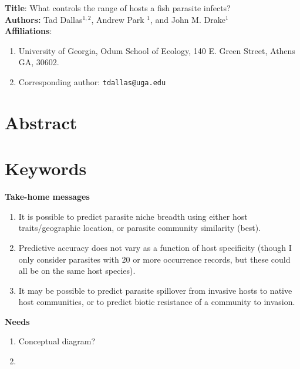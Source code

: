 \documentclass[12pt]{article}
\begin{document}
\setcounter{page}{1}

\textbf{Title}: What controls the range of hosts a fish parasite infects? \\
\vspace{0.5cm}
\textbf{Authors:} Tad Dallas$^{1,2}$, Andrew Park $^{1}$, and John M. Drake$^{1}$ \\
\vspace{0.5cm}
\textbf{Affiliations}: 
\begin{enumerate}
  \item University of Georgia, Odum School of Ecology, 140 E. Green Street, Athens GA, 30602. 
  \item Corresponding author: \texttt{tdallas@uga.edu}
\end{enumerate}


\linenumbers
\doublespacing


\section{Abstract}



\section{Keywords}





\textbf{Take-home messages} \\
\begin{enumerate}
 \item It is possible to predict parasite niche breadth using either host traits/geographic location, or parasite community similarity (best). 
 \item Predictive accuracy does not vary as a function of host specificity (though I only consider parasites with 20 or more occurrence records, but these could all be on the same host species).
 \item It may be possible to predict parasite spillover from invasive hosts to native host communities, or to predict biotic resistance of a community to invasion. 
\end{enumerate}



\textbf{Needs}\\
\begin{enumerate}
 \item Conceptual diagram?
 \item 
\end{enumerate}
\end{document}
